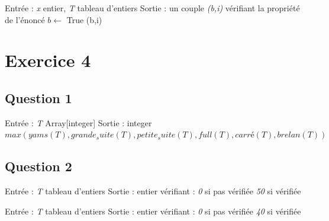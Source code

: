\documentclass{article}
\begin{document}
\begin{algorithm}
    \caption{ : $2^e$ solution}
    \begin{algorithmic}[1]
        \State Entrée : \textit{x} entier, \textit{T} tableau d'entiers
        \State Sortie : un couple \textit{(b,i)} vérifiant la propriété de l'énoncé
                    \State $ b \leftarrow $ True
                    \State \Return (b,i)
                \EndIf
            \EndFor
        \EndFunction
    \end{algorithmic} 
\end{algorithm}

\section{Exercice 4}

\subsection{Question 1}

\begin{algorithm}[H]
    \caption{yamMaxvalue \textit{(avec des fonctions auxiliaires)}}
    \begin{algorithmic}
        \State Entrée : \textit{T} Array[integer]
        \State Sortie : integer 
            \State \Return $ max(yams(T), grande_suite(T), petite_suite(T), full(T), carré(T), brelan(T)) $
        \EndFunction
    \end{algorithmic}
\end{algorithm}

\subsection{Question 2}

\begin{algorithm}[H]
    \caption{\textbf{: Yams}}
    \begin{algorithmic}
        \State Entrée : \textit{T} tableau d'entiers
        \State Sortie : entier vérifiant : 
        \State \Return \textit{0} si pas vérifiée
        \State \Return \textit{50} si vérifiée
    \end{algorithmic}
\end{algorithm}

\begin{algorithm}[H]
    \caption{\textbf{: Grande Suite}}
    \begin{algorithmic}
        \State Entrée : \textit{T} tableau d'entiers
        \State Sortie : entier vérifiant : 
        \State \Return \textit{0} si pas vérifiée
        \State \Return \textit{40} si vérifiée
    \end{algorithmic}
\end{algorithm}
\end{document}
